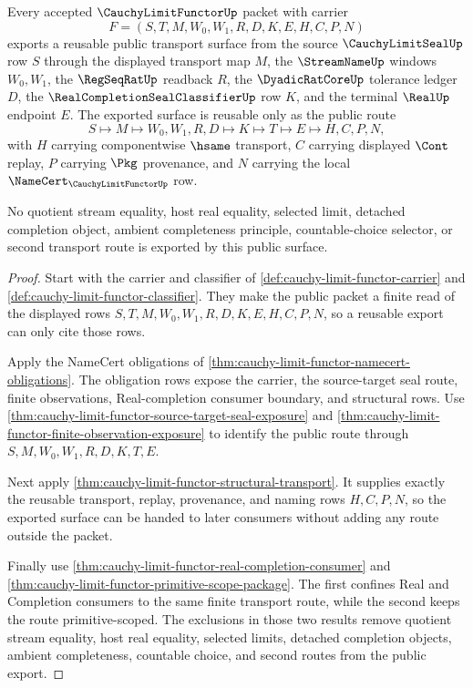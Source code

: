 \begin{theorem}
\label{thm:cauchy-limit-functor-public-seal-export}
Every accepted $\CauchyLimitFunctorUp$ packet with carrier
$$
F=(S,T,M,W_0,W_1,R,D,K,E,H,C,P,N)
$$
exports a reusable public transport surface from the source $\CauchyLimitSealUp$ row $S$ through the displayed transport map $M$, the $\StreamNameUp$ windows $W_0,W_1$, the $\RegSeqRatUp$ readback $R$, the $\DyadicRatCoreUp$ tolerance ledger $D$, the $\RealCompletionSealClassifierUp$ row $K$, and the terminal $\RealUp$ endpoint $E$. The exported surface is reusable only as the public route
$$
S \longmapsto M \longmapsto W_0,W_1,R,D \longmapsto K \longmapsto T \longmapsto E \longmapsto H,C,P,N,
$$
with $H$ carrying componentwise $\hsame$ transport, $C$ carrying displayed $\Cont$ replay, $P$ carrying $\Pkg$ provenance, and $N$ carrying the local $\NameCert_{\CauchyLimitFunctorUp}$ row.

No quotient stream equality, host real equality, selected limit, detached completion object, ambient completeness principle, countable-choice selector, or second transport route is exported by this public surface.
\end{theorem}
\begin{proof}
Start with the carrier and classifier of \autoref{def:cauchy-limit-functor-carrier} and \autoref{def:cauchy-limit-functor-classifier}. They make the public packet a finite read of the displayed rows $S,T,M,W_0,W_1,R,D,K,E,H,C,P,N$, so a reusable export can only cite those rows.

Apply the NameCert obligations of \autoref{thm:cauchy-limit-functor-namecert-obligations}. The obligation rows expose the carrier, the source-target seal route, finite observations, Real-completion consumer boundary, and structural rows. Use \autoref{thm:cauchy-limit-functor-source-target-seal-exposure} and \autoref{thm:cauchy-limit-functor-finite-observation-exposure} to identify the public route through $S,M,W_0,W_1,R,D,K,T,E$.

Next apply \autoref{thm:cauchy-limit-functor-structural-transport}. It supplies exactly the reusable transport, replay, provenance, and naming rows $H,C,P,N$, so the exported surface can be handed to later consumers without adding any route outside the packet.

Finally use \autoref{thm:cauchy-limit-functor-real-completion-consumer} and \autoref{thm:cauchy-limit-functor-primitive-scope-package}. The first confines Real and Completion consumers to the same finite transport route, while the second keeps the route primitive-scoped. The exclusions in those two results remove quotient stream equality, host real equality, selected limits, detached completion objects, ambient completeness, countable choice, and second routes from the public export.
\end{proof}

